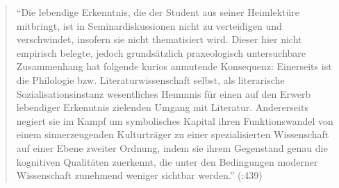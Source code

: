\documentclass[fontsize=12pt]{scrartcl}
\begin{document}
\singlespacing
\begin{quote}
"`Die lebendige Erkenntnis, die der Student aus seiner Heimlekt\"ure mitbringt, ist in Seminardis\-kus\-si\-onen nicht zu verteidigen und \flq ver\-schwin\-det\frq, insofern sie nicht thematisiert wird. Dieser \mbox{hier} nicht empirisch belegte, jedoch grunds\"atzlich praxeologisch untersuchbare Zusammenhang hat folgende kurios anmutende Konsequenz: Einerseits ist die Phi\-lo\-lo\-gie bzw. Li\-te\-ra\-tur\-wissenschaft selbst, als li\-te\-ra\-rische Sozialisationsinstanz we\-sent\-liches Hemmnis f\"ur einen auf den Erwerb lebendiger Erkenntnis zielenden Umgang mit Li\-te\-ra\-tur. An\-de\-rerseits negiert sie im Kampf um sym\-bo\-lisches Kapital ihren Funktionswandel von einem sinnerzeugenden Kulturtr\"ager zu einer spezialisierten Wissenschaft auf einer Ebene zweiter Ordnung, indem sie ihrem Gegenstand genau die ko\-gni\-ti\-ven Qua\-lit\"aten zuerkennt, die unter den Bedingungen moderner Wissenschaft zunehmend weniger sichtbar werden."' (\cite{Gittel2013}:439)
\end{quote}
\onehalfspacing
\end{document}
